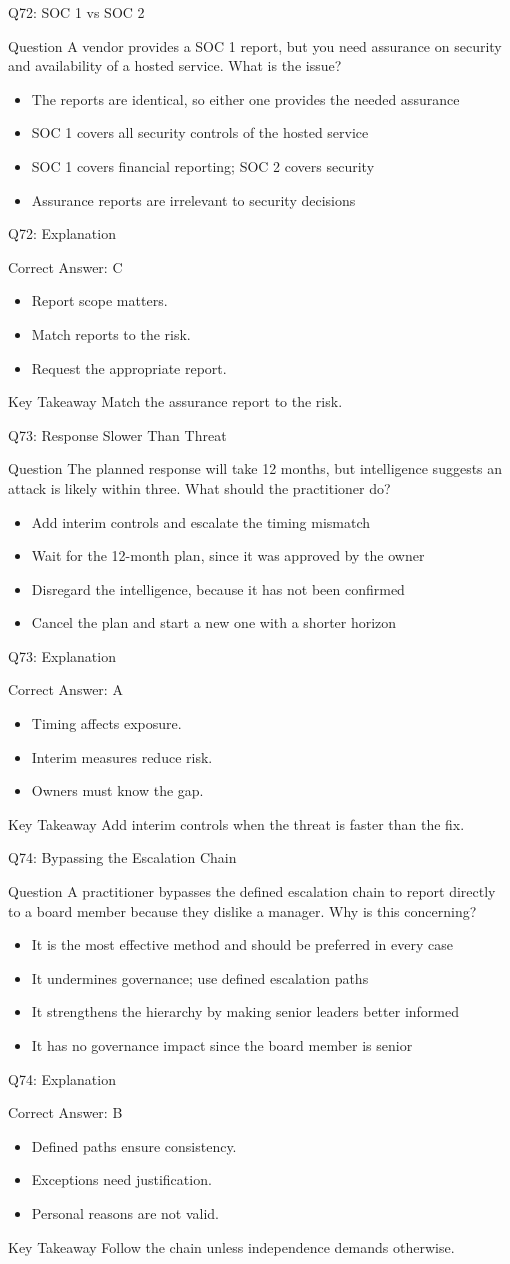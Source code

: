 \documentclass[aspectratio=169]{beamer}
\newcommand{\hq}[7]{%
	\begin{frame}{Q#1: #2}
		\begin{block}{Question}
			#3
		\end{block}
		\begin{itemize}
			#4
		\end{itemize}
	\end{frame}
	\begin{frame}{Q#1: Explanation}
		\begin{block}{Correct Answer: #5}
			\begin{itemize}
				#6
			\end{itemize}
		\end{block}
		\begin{alertblock}{Key Takeaway}
			#7
		\end{alertblock}
	\end{frame}
}
\begin{document}
	\hq{72}{SOC 1 vs SOC 2}
	{A vendor provides a SOC 1 report, but you need assurance on security and availability of a hosted service. What is the issue?}
	{\item[\textbf{(A)}] The reports are identical, so either one provides the needed assurance
		\item[\textbf{(B)}] SOC 1 covers all security controls of the hosted service
		\item[\textbf{(C)}] SOC 1 covers financial reporting; SOC 2 covers security
		\item[\textbf{(D)}] Assurance reports are irrelevant to security decisions}
	{C}
	{\item Report scope matters.
		\item Match reports to the risk.
		\item Request the appropriate report.}
	{Match the assurance report to the risk.}

	\hq{73}{Response Slower Than Threat}
	{The planned response will take 12 months, but intelligence suggests an attack is likely within three. What should the practitioner do?}
	{\item[\textbf{(A)}] Add interim controls and escalate the timing mismatch
		\item[\textbf{(B)}] Wait for the 12-month plan, since it was approved by the owner
		\item[\textbf{(C)}] Disregard the intelligence, because it has not been confirmed
		\item[\textbf{(D)}] Cancel the plan and start a new one with a shorter horizon}
	{A}
	{\item Timing affects exposure.
		\item Interim measures reduce risk.
		\item Owners must know the gap.}
	{Add interim controls when the threat is faster than the fix.}

	\hq{74}{Bypassing the Escalation Chain}
	{A practitioner bypasses the defined escalation chain to report directly to a board member because they dislike a manager. Why is this concerning?}
	{\item[\textbf{(A)}] It is the most effective method and should be preferred in every case
		\item[\textbf{(B)}] It undermines governance; use defined escalation paths
		\item[\textbf{(C)}] It strengthens the hierarchy by making senior leaders better informed
		\item[\textbf{(D)}] It has no governance impact since the board member is senior}
	{B}
	{\item Defined paths ensure consistency.
		\item Exceptions need justification.
		\item Personal reasons are not valid.}
	{Follow the chain unless independence demands otherwise.}
\end{document}
